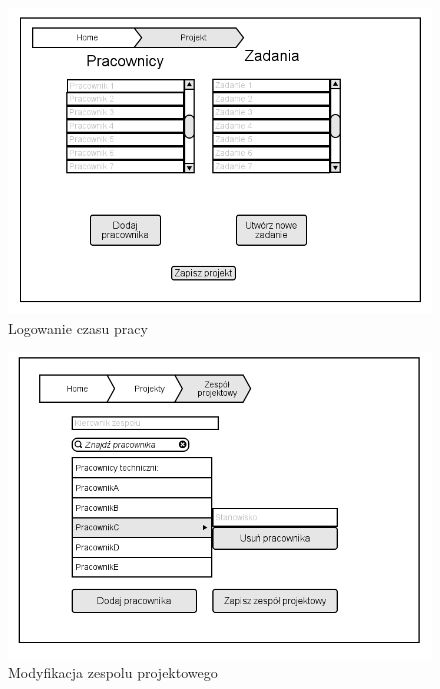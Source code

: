\begin{figure}[H]
    \centering
    \includegraphics[scale=0.7]{diagramy/intefejsy/Projekt.png}
    \caption{Logowanie czasu pracy}
    \label{fig:usecase}
\end{figure}

\begin{figure}[H]
    \centering
    \includegraphics[scale=0.7]{diagramy/intefejsy/Modyfikacja_zespolu_projektowego.png}
    \caption{Modyfikacja zespolu projektowego}
    \label{fig:usecase}
\end{figure}

